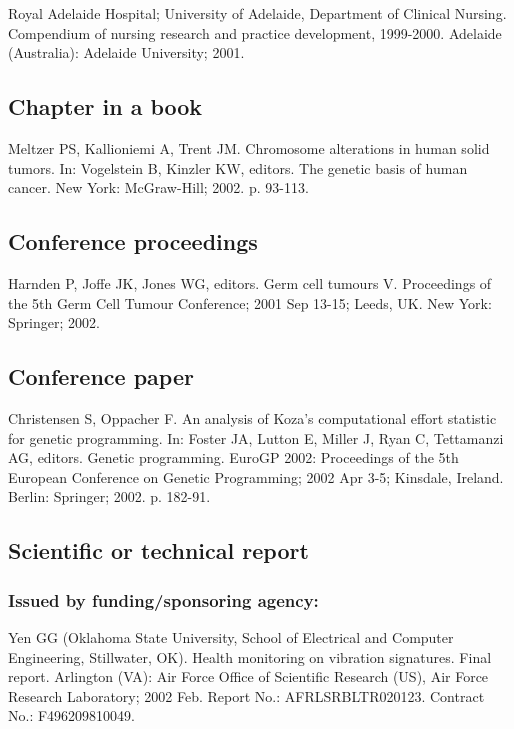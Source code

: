 \documentclass[a4paper,10pt]{article}
\begin{document}
Royal Adelaide Hospital; University of Adelaide, Department of Clinical Nursing. Compendium of nursing research and practice development, 1999-2000. Adelaide (Australia): Adelaide University; 2001.\cite{compendium}

\subsection{Chapter in a book}

Meltzer PS, Kallioniemi A, Trent JM. Chromosome alterations in human solid tumors. In: Vogelstein B, Kinzler KW, editors. The genetic basis of human cancer. New York: McGraw-Hill; 2002. p. 93-113.\cite{meltzer.kallioniemi.ea:genetic}

\subsection{Conference proceedings}

Harnden P, Joffe JK, Jones WG, editors. Germ cell tumours V. Proceedings of the 5th Germ Cell Tumour Conference; 2001 Sep 13-15; Leeds, UK. New York: Springer; 2002.\cite{harnden.joffe.ea:germ}

\subsection{Conference paper}

Christensen S, Oppacher F. An analysis of Koza's computational effort statistic for genetic programming. In: Foster JA, Lutton E, Miller J, Ryan C, Tettamanzi AG, editors. Genetic programming. EuroGP 2002: Proceedings of the 5th European Conference on Genetic Programming; 2002 Apr 3-5; Kinsdale, Ireland. Berlin: Springer; 2002. p. 182-91.\cite{christensen.oppacher:analysis}

\subsection{Scientific or technical report}

\subsubsection{Issued by funding/sponsoring agency:}

Yen GG (Oklahoma State University, School of Electrical and Computer Engineering, Stillwater, OK). Health monitoring on vibration signatures. Final report. Arlington (VA): Air Force Office of Scientific Research (US), Air Force Research Laboratory; 2002 Feb. Report No.: AFRLSRBLTR020123. Contract No.: F496209810049.\cite{yen:health}
\end{document}
